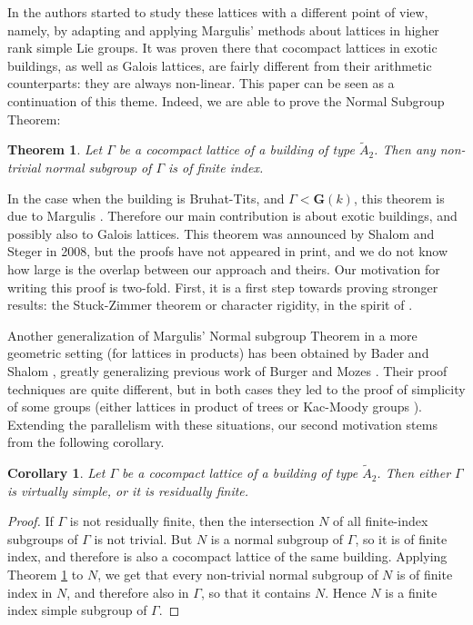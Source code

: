\documentclass[a4paper, 11pt]{article}
\theoremstyle{plain}
\newtheorem{theorem}[proposition]{Theorem}
\newtheorem{corollary}[proposition]{Corollary}
\theoremstyle{definition}
\theoremstyle{remark}
\begin{document}
In \cite{BCL} the authors started to study these lattices with a different point of view, namely, by adapting and applying Margulis' methods about lattices in higher rank simple Lie groups. It was proven there that cocompact lattices in exotic buildings, as well as Galois lattices, are fairly different from their arithmetic counterparts: they are always non-linear. This paper can be seen as a continuation of this theme. Indeed, we are able to prove the Normal Subgroup Theorem:


\begin{theorem}\label{mainthm}
Let $\Gamma$ be a cocompact lattice of a building of type $\tilde A_2$. Then any non-trivial normal subgroup of $\Gamma$ is of finite index.
\end{theorem}

In the case when the building is Bruhat-Tits, and $\Gamma<\mathbf G(k)$, this theorem is due to Margulis \cite{Margulis}. Therefore our main contribution is about exotic buildings, and possibly also to Galois lattices.  
This theorem was announced by Shalom and Steger in 2008, but the proofs have not appeared in print, and we do not know how large is the overlap between our approach and theirs.
 Our motivation for writing this proof is two-fold. First, it is a first step towards proving stronger results: the Stuck-Zimmer theorem \cite{StuckZimmer} or character rigidity, in the spirit of \cite{Peterson}. 


Another generalization of Margulis' Normal subgroup Theorem in a more geometric setting (for lattices in products) has been obtained by Bader and Shalom \cite{BaderShalom}, greatly generalizing previous work of Burger and Mozes \cite{BurgerMozes_lattices}. Their proof techniques are quite different, but in both cases they led to the proof of simplicity of some groups (either lattices in product of trees or Kac-Moody groups \cite{CapraceRemy}). 
Extending the parallelism with these situations, our second motivation stems from the following corollary.

\begin{corollary}
    Let $\Gamma$ be a cocompact lattice of a building of type $\tilde A_2$. Then either $\Gamma$ is virtually simple, or it is residually finite.
\end{corollary}

\begin{proof}
    If $\Gamma$ is not residually finite, then the intersection $N$ of all finite-index subgroups of $\Gamma$ is not trivial. But $N$ is a normal subgroup of $\Gamma$, so it is of finite index, and therefore is also a cocompact lattice of the same building. Applying Theorem \ref{mainthm} to $N$, we get that every non-trivial normal subgroup of $N$ is of finite index in $N$, and therefore also in $\Gamma$, so that it contains $N$. Hence $N$ is a finite index simple subgroup of $\Gamma$.
\end{proof}
\end{document}
